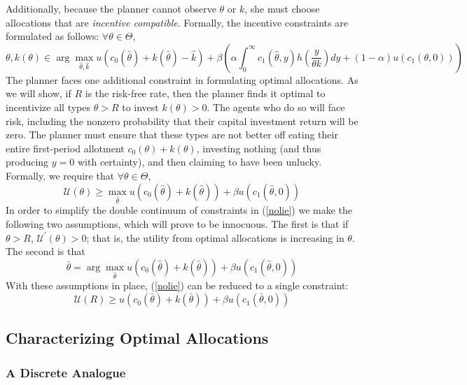 \documentclass[11pt]{article}
\newcommand{\p}{\prime}
\newcommand{\U}{\mathcal{U}}
\begin{document}
Additionally, because the planner cannot observe \( \theta \) or \( k \), she must choose allocations that are \textit{incentive compatible}. Formally, the incentive constraints are formulated as follows: \( \forall \theta\in\Theta \),
\begin{equation}
    \theta, k(\theta)\in\arg\max_{\hat{\theta},\hat{k}}u\left( c_0(\hat{\theta}) + k(\hat{\theta}) - \hat{k} \right) + \beta\left( \alpha\int_{0}^{\infty}c_1(\hat{\theta},y)h\left( \frac{y}{\theta k} \right)dy + (1 - \alpha)u\left( c_1\left( \theta,0 \right) \right) \right) \label{ics}
\end{equation}
The planner faces one additional constraint in formulating optimal allocations. As we will show, if \( R \) is the risk-free rate, then the planner finds it optimal to incentivize all types \( \theta > R \) to invest \( k(\theta)>0 \). The agents who do so will face risk, including the nonzero probability that their capital investment return will be zero. The planner must ensure that these types are not better off eating their entire first-period allotment \( c_0(\theta) + k(\theta) \), investing nothing (and thus producing \( y = 0 \) with certainty), and then claiming to have been unlucky. Formally, we require that \( \forall\theta\in\Theta \),
\begin{equation}
    \U(\theta)\geq \max_{\hat{\theta}} u\left( c_0(\hat{\theta}) + k(\hat{\theta}) \right) + \beta u\left( c_1(\hat{\theta},0) \right) \label{nolie}
\end{equation}
In order to simplify the double continuum of constraints in (\ref{nolie}) we make the following two assumptions, which will prove to be innocuous. The first is that if \( \theta > R \), \( \U^\p(\theta) > 0 \); that is, the utility from optimal allocations is increasing in \( \theta \). The second is that 
\begin{equation}
    \bar{\theta} = \arg \max_{\hat{\theta}} u\left( c_0(\hat{\theta}) + k(\hat{\theta}) \right) + \beta u\left( c_1(\hat{\theta},0) \right) 
\end{equation}
With these assumptions in place, (\ref{nolie}) can be reduced to a single constraint:
\begin{equation}
    \U(R)\geq u\left( c_0(\bar{\theta}) + k(\bar{\theta}) \right) + \beta u\left( c_1(\bar{\theta},0) \right) \label{nolie1}
\end{equation}

\subsection{Characterizing Optimal Allocations}
\subsubsection{A Discrete Analogue}



\end{document}
